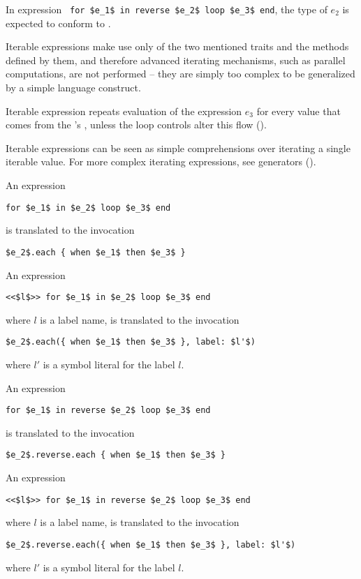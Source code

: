 In expression ~\lstinline!for $e_1$ in reverse $e_2$ loop $e_3$ end!, the type of $e_2$ is expected to conform to . 

Iterable expressions make use only of the two mentioned traits and the methods defined by them, and therefore advanced iterating mechanisms, such as parallel computations, are not performed -- they are simply too complex to be generalized by a simple language construct. 

Iterable expression repeats evaluation of the expression $e_3$ for every value that comes from the 's , unless the loop controls alter this flow ().

Iterable expressions can be seen as simple comprehensions over iterating a single iterable value. For more complex iterating expressions, see generators ().

An expression 
\begin{lstlisting}
for $e_1$ in $e_2$ loop $e_3$ end
\end{lstlisting} 
is translated to the invocation
\begin{lstlisting}
$e_2$.each { when $e_1$ then $e_3$ }
\end{lstlisting} 

An expression 
\begin{lstlisting}
<<$l$>> for $e_1$ in $e_2$ loop $e_3$ end
\end{lstlisting} 
where $l$ is a label name, is translated to the invocation
\begin{lstlisting}[deletekeywords={label}]
$e_2$.each({ when $e_1$ then $e_3$ }, label: $l'$)
\end{lstlisting}
where $l'$ is a symbol literal for the label $l$. 

An expression 
\begin{lstlisting}
for $e_1$ in reverse $e_2$ loop $e_3$ end
\end{lstlisting} 
is translated to the invocation
\begin{lstlisting}[deletekeywords={reverse}]
$e_2$.reverse.each { when $e_1$ then $e_3$ }
\end{lstlisting} 

An expression 
\begin{lstlisting}
<<$l$>> for $e_1$ in reverse $e_2$ loop $e_3$ end
\end{lstlisting} 
where $l$ is a label name, is translated to the invocation
\begin{lstlisting}[deletekeywords={label,reverse}]
$e_2$.reverse.each({ when $e_1$ then $e_3$ }, label: $l'$)
\end{lstlisting}
where $l'$ is a symbol literal for the label $l$. 

